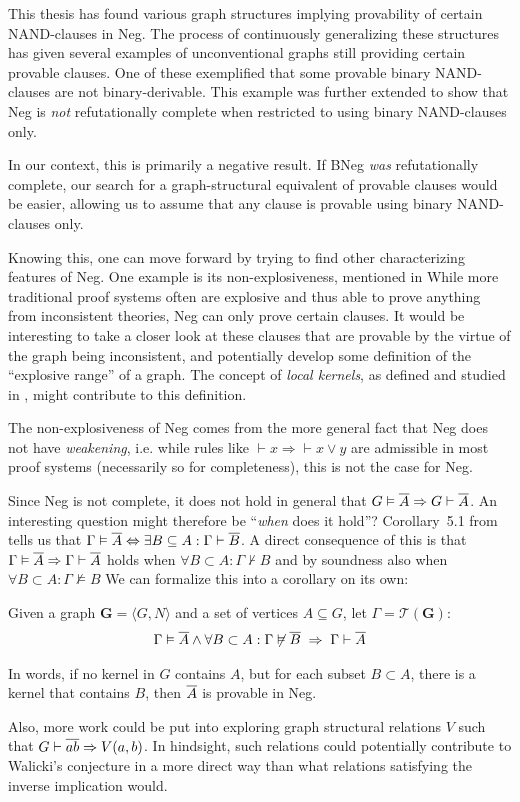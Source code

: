 This thesis has found various graph structures implying provability of certain NAND-clauses in Neg.
The process of continuously generalizing these structures has given several examples of unconventional graphs still providing certain provable clauses.
One of these exemplified that some provable binary NAND-clauses are not binary-derivable.
This example was further extended to show that Neg is \textit{not} refutationally complete when restricted to using binary NAND-clauses only.

In our context, this is primarily a negative result.
If BNeg \textit{was} refutationally complete, our search for a graph-structural equivalent of provable clauses would be easier, allowing us to assume that any clause is provable using binary NAND-clauses only.

Knowing this, one can move forward by trying to find other characterizing features of Neg.
One example is its non-explosiveness, mentioned in \cite{michal-completeness}
While more traditional proof systems often are explosive and thus able to prove anything from inconsistent theories, Neg can only prove certain clauses.
It would be interesting to take a closer look at these clauses that are provable by the virtue of the graph being inconsistent, and potentially develop some definition of the ``explosive range'' of a graph.
The concept of \textit{local kernels}, as defined and studied in \cite{synthese-pdl}, might contribute to this definition.

The non-explosiveness of Neg comes from the more general fact that Neg does not have \textit{weakening}, i.e. while rules like $\vdash x \Rightarrow \vdash x \vee y$ are admissible in most proof systems (necessarily so for completeness), this is not the case for Neg.

Since Neg is not complete, it does not hold in general that $G \vDash \ol{A} \Rightarrow G \vdash \ol{A}$.
An interesting question might therefore be ``\textit{when} does it hold''?
Corollary~5.1 from \cite{michal-completeness} tells us that $\Gamma \vDash \ol{A} \Leftrightarrow \exists B \subseteq A: \Gamma \vdash \ol{B}$.
A direct consequence of this is that $\Gamma \vDash \ol{A} \Rightarrow \Gamma \vdash \ol{A}$ holds when $\forall B \subset A: \Gamma \not\vdash B$ and by soundness also when $\forall B \subset A: \Gamma \not\vDash B$
We can formalize this into a corollary on its own:
\begin{corollary}
  Given a graph $\mathbf{G} = \langle G,N \rangle$ and a set of vertices $A \subseteq G$, let $\Gamma = \mathcal{T}(\mathbf{G})$:
  \begin{align}
    \Gamma \vDash \ol{A} \wedge \forall B \subset A: \Gamma \not\vDash \ol{ B } \;\Rightarrow \; \Gamma \vdash \ol{A}
  \end{align}
\end{corollary}
In words, if no kernel in $G$ contains $A$, but for each subset $B \subset A$, there is a kernel that contains $B$, then $\ol{A}$ is provable in Neg.

Also, more work could be put into exploring graph structural relations $V$ such that $G \vdash \ol{ab} \Rightarrow V(a,b)$.
In hindsight, such relations could potentially contribute to Walicki's conjecture in a more direct way than what relations satisfying the inverse implication would.
